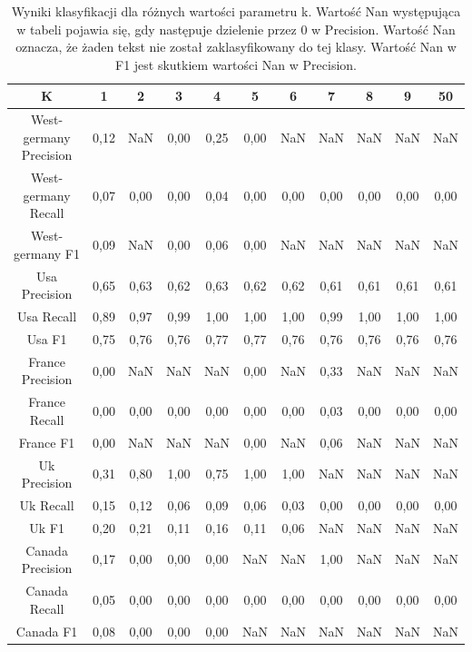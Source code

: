 \documentclass{classrep}
\begin{document}
\newpage
\begin{table}[h!]
\caption{Wyniki klasyfikacji dla różnych wartości parametru k. Wartość Nan występująca w tabeli pojawia się, gdy następuje dzielenie przez 0 w Precision. Wartość Nan oznacza, że żaden tekst nie został zaklasyfikowany do tej klasy. Wartość Nan w F1 jest skutkiem wartości Nan w Precision.}
\centering
\vspace{0.1cm}
 \begin{tabular}{c c c c c c c c c c c}

    \textbf{K} & \textbf{1}   & \textbf{2}  & \textbf{3}  & \textbf{4}  & \textbf{5} & \textbf{6}   & \textbf{7}  & \textbf{8}  & \textbf{9}  & \textbf{50} \\

\hline
West-germany Precision 	& 0,12 & NaN & 0,00 & 0,25 & 0,00 & NaN  & NaN & NaN & NaN  & NaN\\
West-germany Recall 		& 0,07 & 0,00 & 0,00 & 0,04 & 0,00 & 0,00 & 0,00 & 0,00 & 0,00 & 0,00\\
West-germany F1		& 0,09 & NaN & 0,00 & 0,06 & 0,00 & NaN  & NaN & NaN & NaN  & NaN \\
\hline
Usa Precision 			& 0,65 & 0,63 & 0,62 & 0,63 & 0,62 & 0,62 & 0,61 & 0,61 & 0,61 & 0,61 \\
Usa Recall				& 0,89 & 0,97 & 0,99 & 1,00 & 1,00 & 1,00 & 0,99 & 1,00 & 1,00 & 1,00 \\
Usa F1			 	& 0,75 & 0,76 & 0,76 & 0,77 & 0,77 & 0,76 & 0,76 & 0,76 & 0,76 & 0,76 \\
\hline
France Precision 		& 0,00 & NaN & NaN & NaN  & 0,00  & NaN & 0,33 & NaN  & NaN & NaN \\
France Recall 			& 0,00 & 0,00 & 0,00 & 0,00 & 0,00 & 0,00 & 0,03 & 0,00 & 0,00 & 0,00 \\
France F1 				& 0,00 & NaN & NaN & NaN  & 0,00 & NaN & 0,06 & NaN  & NaN & NaN\\
\hline
Uk Precision 			& 0,31 & 0,80 & 1,00 & 0,75 & 1,00  & 1,00 & NaN & NaN  & NaN & NaN\\
Uk Recall 				& 0,15 & 0,12 & 0,06 & 0,09 & 0,06 & 0,03 & 0,00 & 0,00 & 0,00 & 0,00\\
Uk F1 				& 0,20 & 0,21 & 0,11 & 0,16 & 0,11  & 0,06 & NaN & NaN  & NaN & NaN \\
\hline
Canada Precision		& 0,17 & 0,00 & 0,00 & 0,00 & NaN & NaN & 1,00 & NaN  & NaN & NaN\\
Canada Recall 			& 0,05 & 0,00 & 0,00 & 0,00 & 0,00 & 0,00 & 0,00 & 0,00 & 0,00 & 0,00 \\
Canada F1 			& 0,08 & 0,00 & 0,00 & 0,00 & NaN & NaN & NaN &  NaN  & NaN & NaN \\

\end{tabular}
\end{table}
\end{document}
